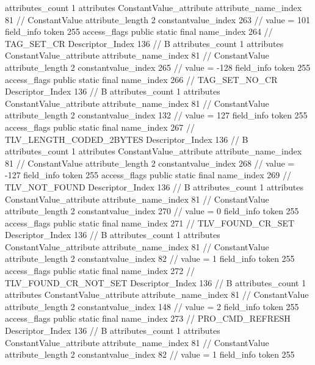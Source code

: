 {{{{{				attributes_count	1
				attributes {
				ConstantValue_attribute {
					attribute_name_index	81		// ConstantValue
					attribute_length	2
					constantvalue_index	263		// value = 101
				}
				}
			}
			field_info {
				token	255
				access_flags	public static final
				name_index	264		// TAG_SET_CR
				Descriptor_Index	136		// B
				attributes_count	1
				attributes {
				ConstantValue_attribute {
					attribute_name_index	81		// ConstantValue
					attribute_length	2
					constantvalue_index	265		// value = -128
				}
				}
			}
			field_info {
				token	255
				access_flags	public static final
				name_index	266		// TAG_SET_NO_CR
				Descriptor_Index	136		// B
				attributes_count	1
				attributes {
				ConstantValue_attribute {
					attribute_name_index	81		// ConstantValue
					attribute_length	2
					constantvalue_index	132		// value = 127
				}
				}
			}
			field_info {
				token	255
				access_flags	public static final
				name_index	267		// TLV_LENGTH_CODED_2BYTES
				Descriptor_Index	136		// B
				attributes_count	1
				attributes {
				ConstantValue_attribute {
					attribute_name_index	81		// ConstantValue
					attribute_length	2
					constantvalue_index	268		// value = -127
				}
				}
			}
			field_info {
				token	255
				access_flags	public static final
				name_index	269		// TLV_NOT_FOUND
				Descriptor_Index	136		// B
				attributes_count	1
				attributes {
				ConstantValue_attribute {
					attribute_name_index	81		// ConstantValue
					attribute_length	2
					constantvalue_index	270		// value = 0
				}
				}
			}
			field_info {
				token	255
				access_flags	public static final
				name_index	271		// TLV_FOUND_CR_SET
				Descriptor_Index	136		// B
				attributes_count	1
				attributes {
				ConstantValue_attribute {
					attribute_name_index	81		// ConstantValue
					attribute_length	2
					constantvalue_index	82		// value = 1
				}
				}
			}
			field_info {
				token	255
				access_flags	public static final
				name_index	272		// TLV_FOUND_CR_NOT_SET
				Descriptor_Index	136		// B
				attributes_count	1
				attributes {
				ConstantValue_attribute {
					attribute_name_index	81		// ConstantValue
					attribute_length	2
					constantvalue_index	148		// value = 2
				}
				}
			}
			field_info {
				token	255
				access_flags	public static final
				name_index	273		// PRO_CMD_REFRESH
				Descriptor_Index	136		// B
				attributes_count	1
				attributes {
				ConstantValue_attribute {
					attribute_name_index	81		// ConstantValue
					attribute_length	2
					constantvalue_index	82		// value = 1
				}
				}
			}
			field_info {
				token	255
}}}}}
